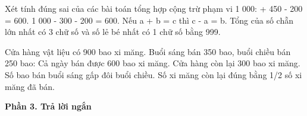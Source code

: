 \begin{ex} %
Xét tính đúng sai của các bài toán tổng hợp cộng trừ phạm vi 1 000:
\choiceTF
{ + 450 - 200 = 600.}
{1 000 - 300 - 200 = 600.}
{\True Nếu a + b = c thì c - a = b.}
{\True Tổng của số chẵn lớn nhất có 3 chữ số và số lẻ bé nhất có 1 chữ số bằng 999.}
\end{ex}

\begin{ex} %
Cửa hàng vật liệu có 900 bao xi măng. Buổi sáng bán 350 bao, buổi chiều bán 250 bao:
\choiceTF
{\True Cả ngày bán được 600 bao xi măng.}
{\True Cửa hàng còn lại 300 bao xi măng.}
{Số bao bán buổi sáng gấp đôi buổi chiều.}
{\True Số xi măng còn lại đúng bằng 1/2 số xi măng đã bán.}
\end{ex}

\textbf{Phần 3. Trả lời ngắn}

